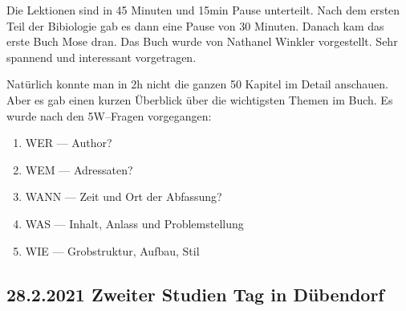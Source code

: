 Die Lektionen sind in 45 Minuten und 15min Pause unterteilt. Nach dem ersten Teil der Bibiologie gab es dann eine Pause von 30 Minuten. Danach kam das erste Buch Mose dran. Das Buch wurde von Nathanel Winkler vorgestellt. Sehr spannend und interessant vorgetragen.

Natürlich konnte man in 2h nicht die ganzen 50 Kapitel im Detail anschauen. Aber es gab einen kurzen Überblick über die wichtigsten Themen im Buch. Es wurde nach den 5W--Fragen vorgegangen:
\begin{enumerate}
    \item WER --- Author?
    \item WEM --- Adressaten?
    \item WANN --- Zeit und Ort der Abfassung?
    \item WAS --- Inhalt, Anlass und Problemstellung
    \item WIE --- Grobstruktur, Aufbau, Stil
\end{enumerate}
\subsection{28.2.2021 Zweiter Studien Tag in Dübendorf}